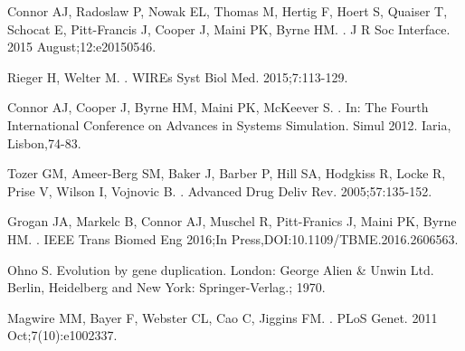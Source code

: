 \documentclass[10pt,letterpaper]{article}
\begin{document}
\begin{thebibliography}{10}
Connor AJ, Radoslaw P, Nowak EL, Thomas M, Hertig F, Hoert S, Quaiser T, Schocat E, Pitt-Francis J, Cooper J, Maini PK, Byrne HM.
.
\newblock J R Soc Interface. 2015 August;12:e20150546.

Rieger H, Welter M.
.
\newblock WIREs Syst Biol Med. 2015;7:113-129.

Connor AJ, Cooper J, Byrne HM, Maini PK, McKeever S.
.
\newblock In: The Fourth International Conference on Advances in Systems Simulation. Simul 2012. Iaria, Lisbon,74-83.

Tozer GM, Ameer-Berg SM, Baker J, Barber P, Hill SA, Hodgkiss R, Locke R, Prise V, Wilson I, Vojnovic B.
.
\newblock Advanced Drug Deliv Rev. 2005;57:135-152.

Grogan JA, Markelc B, Connor AJ, Muschel R, Pitt-Franics J, Maini PK, Byrne HM.
.
\newblock IEEE Trans Biomed Eng 2016;In Press,DOI:10.1109/TBME.2016.2606563.

Ohno S.
\newblock Evolution by gene duplication.
\newblock London: George Alien \& Unwin Ltd. Berlin, Heidelberg and New York:
  Springer-Verlag.; 1970.

Magwire MM, Bayer F, Webster CL, Cao C, Jiggins FM.
.
\newblock PLoS Genet. 2011 Oct;7(10):e1002337.

\end{thebibliography}
\end{document}
